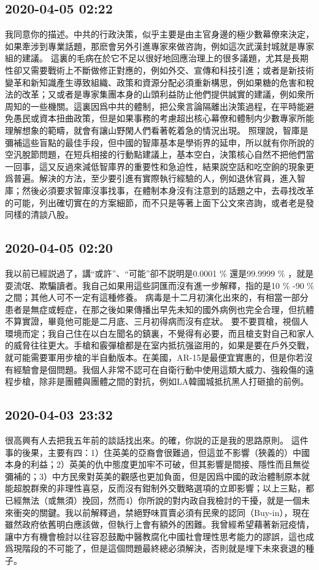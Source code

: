 \documentclass[twocolumn]{ctexart}
\begin{document}
\subsection*{2020-04-05 02:22}

我同意你的描述。中共的行政決策，似乎主要是由主官身邊的極少數幕僚來決定，如果牽涉到專業話題，那麽會另外引進專家來做咨詢，例如這次武漢封城就是專家組的建議。
這裏的毛病在於它不足以很好地回應治理上的很多議題，尤其是長期性卻又需要戰術上不斷做修正對應的，例如外交、宣傳和科技引進；或者是新技術變革和新知識產生導致組織、政策和資源分配必須重新構思，例如果糖的危害和稅法的改革；又或者是專家集團本身的山頭利益防止他們提供誠實的建議，例如衆所周知的一些機關。這裏因爲中共的體制，把公衆言論隔離出決策過程，在平時能避免愚民或資本扭曲政策，但是如果事務的考慮超出核心幕僚和體制内少數專家所能理解想象的範疇，就會有讓山野閑人們看著乾着急的情況出現。
照理說，智庫是彌補這些盲點的最佳手段，但中國的智庫基本是學術界的延申，所以就有你所說的空汎脫節問題，在短兵相接的行動點建議上，基本空白，決策核心自然不把他們當一回事，這又反過來減低智庫界的重要性和急迫性，結果説空話和吃空餉的現象更爲普遍。解決的方法，至少要引進有實際執行經驗的人，例如退休官員，進入智庫；然後必須要求智庫沒事找事，在體制本身沒有注意到的話題之中，去尋找改革的可能，列出確切實在的方案細節，而不只是等著上面下公文來咨詢，或者老是發同樣的清談八股。
\subsection*{2020-04-05 02:20}

我以前已經説過了，講“或許”、“可能”卻不説明是0.0001 \% 還是99.9999 \% ，就是耍流氓、欺騙讀者。我自己如果用這些詞匯而沒有進一步解釋，指的是10 \% -90 \% 之間；其他人可不一定有這種修養。
病毒是十二月初演化出來的，有相當一部分患者是無症或輕症，在那之後如果傳播出早先未知的國外病例也完全合理，但抗體不算實證，畢竟他可能是二月底、三月初得病而沒有症狀。
要不要買槍，視個人環境而定；我自己住在以白左聞名的鎮裏，不覺得有必要，而且槍支對自己和家人的威脅往往更大。手槍和霰彈槍都是在室内抵抗强盜用的，如果是要在戶外交戰，就可能需要軍用步槍的半自動版本。在美國，AR-15是最便宜實惠的，但是你若沒有經驗會是個問題。我個人非常不認可在自衛行動中使用這類大威力、強殺傷的遠程步槍，除非是團體與團體之間的對抗，例如LA韓國城抵抗黑人打砸搶的前例。
\subsection*{2020-04-03 23:32}

很高興有人去把我五年前的談話找出來。的確，你説的正是我的思路原則。
這件事的後果，主要有四：1）住英美的亞裔會很難過，但這並不影響（狹義的）中國本身的利益；2）英美的仇中態度更加牢不可破，但其影響是間接、隱性而且無從彌補的；3）中方民衆對英美的觀感也更加負面，但是因爲中國的政治體制原本就能超脫群衆的非理性喜惡，反而沒有鉗制外交戰略選項的立即影響；以上三點，都已經無法（或無須）挽回，然而4）你所說的對内政自我檢討的干擾，就是一個未來衝突的關鍵。我以前解釋過，禁絕野味買賣必須有民衆的認同（Buy-in），現在雖然政府依舊明白應該做，但執行上會有額外的困難。我曾經希望藉著新冠疫情，讓中方有機會檢討以往容忍鼓勵中醫教腐化中國社會理性思考能力的謬誤，這也成爲現階段的不可能了，但是這個問題最終總必須解決，否則就是埋下未來衰退的種子。
\end{document}
